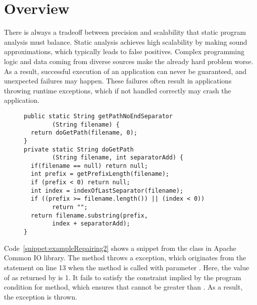 \section{Overview}
\label{sec:overview}

There is always a tradeoff between precision and scalability that static program
analysis must balance.
Static analysis achieves high scalability by making sound
approximations, which typically leads to false positives. Complex programming
logic and data coming from diverse sources make the already hard problem worse.
As a result, successful execution of an application can never be guaranteed,
and unexpected failures may happen. These failures often result in applications
throwing runtime exceptions, which if not handled correctly may crash the
application.


\begin{figure}[t]
\centering
\begin{lstlisting}
public static String getPathNoEndSeparator
        (String filename) {
  return doGetPath(filename, 0);
}
private static String doGetPath
        (String filename, int separatorAdd) {
  if(filename == null) return null;
  int prefix = getPrefixLength(filename);
  if (prefix < 0) return null;
  int index = indexOfLastSeparator(filename);
  if ((prefix >= filename.length()) || (index < 0))
        return "";
  return filename.substring(prefix,
        index + separatorAdd);
}
\end{lstlisting}
\end{figure}

Code~\ref{snippet:exampleRepairing2}
shows a snippet
from the
 class in Apache Common IO library. The method
 throws a  exception,
which originates from the  statement
on line 13 when
the method is called with parameter
.  Here, the value of  as returned by
 is 1. It fails to satisfy the constraint implied by the
program condition  for 
method, which ensures that  cannot be greater than
. As a result, the exception is thrown.


